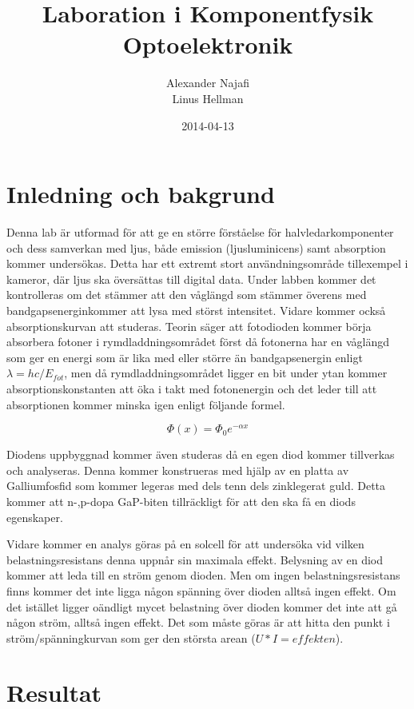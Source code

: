 \documentclass[a4paper]{article}
\title{Laboration i Komponentfysik\\ Optoelektronik}
\author{Alexander Najafi \\ Linus Hellman}
\date{2014-04-13}
\begin{document}
\maketitle
\thispagestyle{empty}
\newpage

\tableofcontents
\newpage

\section{Inledning och bakgrund}

Denna lab är utformad för att ge en större förståelse för halvledarkomponenter och dess samverkan med ljus, både emission (ljusluminicens) samt absorption kommer undersökas. Detta har ett extremt stort användningsområde tillexempel i kameror, där ljus ska översättas till digital data. Under labben kommer det kontrolleras om det stämmer att den våglängd som stämmer överens med bandgapsenerginkommer att lysa med störst intensitet. Vidare kommer också absorptionskurvan att studeras. Teorin säger att fotodioden kommer börja absorbera fotoner i rymdladdningsområdet först då fotonerna har en våglängd som ger en energi som är lika med eller större än bandgapsenergin enligt $\lambda = hc/E_{fot}$, men då rymdladdningsområdet ligger en bit under ytan kommer absorptionskonstanten att öka i takt med fotonenergin och det leder till att absorptionen kommer minska igen enligt följande formel.

\begin{equation}
  \Phi(x) =\Phi_0e^{-\alpha x}
\end{equation}

Diodens uppbyggnad kommer även studeras då en egen diod kommer tillverkas och analyseras. Denna kommer konstrueras med hjälp av en platta av Galliumfosfid som kommer legeras med dels tenn dels zinklegerat guld. Detta kommer att n-,p-dopa GaP-biten tillräckligt för att den ska få en diods egenskaper. 

Vidare kommer en analys göras på en solcell för att undersöka vid vilken belastningsresistans denna uppnår sin maximala effekt. Belysning av en diod kommer att leda till en ström genom dioden. Men om ingen belastningsresistans finns kommer det inte ligga någon spänning över dioden alltså ingen effekt. Om det istället ligger oändligt mycet belastning över dioden kommer det inte att gå någon ström, alltså ingen effekt. Det som måste göras är att hitta den punkt i ström/spänningkurvan som ger den största arean ($U*I=effekten$).
\newpage
\section{Resultat}
\end{document}
